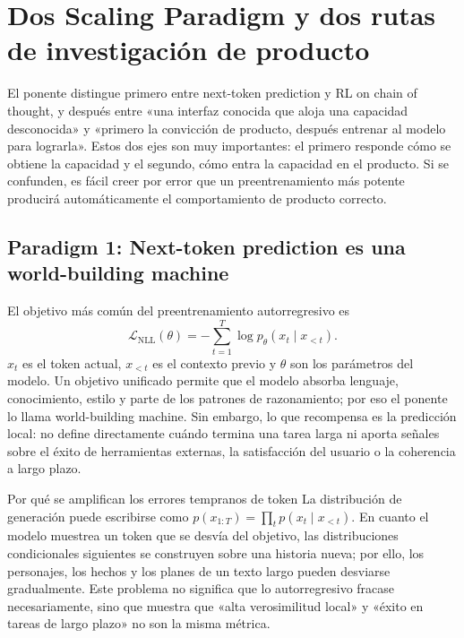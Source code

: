 \section{Dos Scaling Paradigm y dos rutas de investigación de producto}

El ponente distingue primero entre next-token prediction y RL on chain of thought, y después entre «una interfaz conocida que aloja una capacidad desconocida» y «primero la convicción de producto, después entrenar al modelo para lograrla». Estos dos ejes son muy importantes: el primero responde cómo se obtiene la capacidad y el segundo, cómo entra la capacidad en el producto. Si se confunden, es fácil creer por error que un preentrenamiento más potente producirá automáticamente el comportamiento de producto correcto.

\subsection{Paradigm 1: Next-token prediction es una world-building machine}

El objetivo más común del preentrenamiento autorregresivo es
\[
\mathcal{L}_{\text{NLL}}(\theta)
=-\sum_{t=1}^{T}\log p_{\theta}(x_t\mid x_{<t}).
\]
$x_t$ es el token actual, $x_{<t}$ es el contexto previo y $\theta$ son los parámetros del modelo. Un objetivo unificado permite que el modelo absorba lenguaje, conocimiento, estilo y parte de los patrones de razonamiento; por eso el ponente lo llama world-building machine. Sin embargo, lo que recompensa es la predicción local: no define directamente cuándo termina una tarea larga ni aporta señales sobre el éxito de herramientas externas, la satisfacción del usuario o la coherencia a largo plazo.


\begin{knowledgebox}{Por qué se amplifican los errores tempranos de token}
La distribución de generación puede escribirse como $p(x_{1:T})=\prod_t p(x_t\mid x_{<t})$. En cuanto el modelo muestrea un token que se desvía del objetivo, las distribuciones condicionales siguientes se construyen sobre una historia nueva; por ello, los personajes, los hechos y los planes de un texto largo pueden desviarse gradualmente. Este problema no significa que lo autorregresivo fracase necesariamente, sino que muestra que «alta verosimilitud local» y «éxito en tareas de largo plazo» no son la misma métrica.
\end{knowledgebox}

